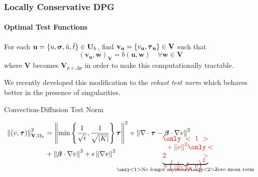 \documentclass[18pt,xcolor=table]{beamer}
\newcounter{nn}
\begin{document}
\begin{frame}
\frametitle{Locally Conservative DPG}
\framesubtitle{Optimal Test Functions}
For each $\mathbf{u}=\{u,\boldsymbol\sigma,\hat u,\hat t\}\in\mathbf{U}_h$, find
$\mathbf{v}_{\mathbf{u}}=\{v_\mathbf{u},\boldsymbol\tau_\mathbf{u}\}\in\mathbf{V}$ such that
\[
(\mathbf{v_u},\mathbf{w})_\mathbf{V}=b(\mathbf{u},\mathbf{w})\quad\forall\mathbf{w}\in\mathbf{V}
\]
where $\mathbf{V}$ becomes $\mathbf{V}_{p+\Delta p}$ in order to make this
computationally tractable.

We recently developed this modification to the \emph{robust test norm}
 which behaves better in
the presence of singularities.
\begin{block}{Convection-Diffusion Test Norm}
\begin{minipage}[t][1.2in]{\textwidth}
\begin{align*}
\norm{(v,\bftau)}^2_{\mathbf{V},\Omega_h}&=
\norm{\min\left\{\frac{1}{\sqrt{\epsilon}},\frac{1}{\sqrt{|K|}}\right\}\bftau}^2
+\norm{\nabla\cdot\bftau-\bfbeta\cdot\nabla v}^2\\
&+\norm{\bfbeta\cdot\nabla v}^2+\epsilon\norm{\nabla v}^2
\underbrace{\color{red}{
\begin{minipage}[c][0.3in][c]{0.9in}$
\only<1>{
\hspace{1.5ex}
+\norm{v}^2
}
\only<2>{
+\left(\frac{1}{|K|}\int_Kv\right)^2
}$
\end{minipage}
}}_{\only<1>{\text{No longer necessary}}\only<2>{\text{Zero mean term}}}
\end{align*}
\end{minipage}
\end{block}
\end{frame}

\end{document}
